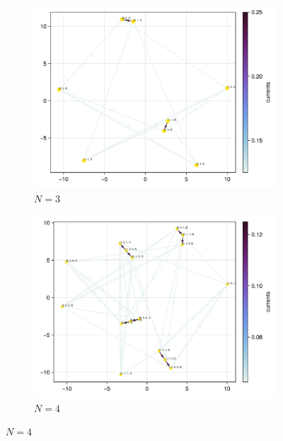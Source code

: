 \documentclass[11pt]{article}
\theoremstyle{nothm}
\begin{document}
\begin{tcolorbox}
    \begin{figure}[H]
        \centering
        \begin{subfigure}[t]{0.49\textwidth}
            \centering
            \includegraphics[width=\textwidth]{../../plots/ones/cc1/spring_N=3_metadata=(chash=5795298381321907906,ctype=simple).png}
            \caption{$N=3$}
        \end{subfigure}
        \begin{subfigure}[t]{0.49\textwidth}
            \centering
            \includegraphics[width=\textwidth]{../../plots/ones/cc1/spring_N=4_metadata=(chash=5795298381321907906,ctype=simple).png}
            \caption{$N=4$}

\end{subfigure}
\end{figure}
\end{tcolorbox}
\end{document}
